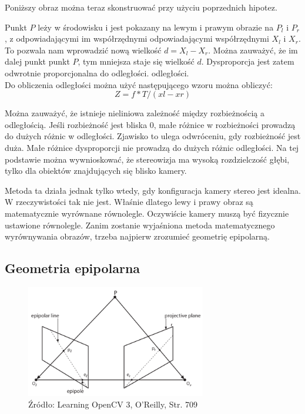 \documentclass[magisterska]{pracadypl}
\begin{document}
Poniższy obraz można teraz skonstruować przy użyciu poprzednich hipotez.

Punkt $P$ leży w środowisku i jest pokazany na
lewym i prawym obrazie na $P_l$ i $P_r$, z odpowiadającymi im współrzędnymi
odpowiadającymi współrzędnymi $X_l$ i $X_r$. To
pozwala nam wprowadzić nową wielkość
$d = X_l - X_r$. Można zauważyć, że im dalej punkt
punkt $P$, tym mniejsza staje się wielkość $d$. Dysproporcja
jest zatem odwrotnie proporcjonalna do odległości.
odległości.\\
Do obliczenia odległości można użyć następującego wzoru
można obliczyć: \[Z=f*T/(xl-xr)\]

Można zauważyć, że istnieje nieliniowa zależność między rozbieżnością a odległością.
Jeśli rozbieżność jest bliska 0, małe różnice w rozbieżności prowadzą do dużych różnic w odległości.
Zjawisko to ulega odwróceniu, gdy rozbieżność jest duża. Małe różnice dysproporcji nie prowadzą do dużych różnic odległości. Na tej podstawie można wywnioskować, że stereowizja ma wysoką rozdzielczość głębi, tylko dla obiektów znajdujących się blisko kamery.

Metoda ta działa jednak tylko wtedy, gdy konfiguracja kamery stereo jest idealna. W
rzeczywistości tak nie jest. Właśnie dlatego lewy i prawy obraz są
matematycznie wyrównane równolegle. Oczywiście kamery muszą być fizycznie ustawione równolegle.
Zanim zostanie wyjaśniona metoda matematycznego wyrównywania obrazów, trzeba najpierw zrozumieć geometrię epipolarną.

\subsection{Geometria epipolarna}

\begin{figure}[h]  %
    \centering  %
    \includegraphics[width=0.7\textwidth]{images/epipolar.png}  %
    \captionsetup{labelformat=empty, font=footnotesize}
    \caption{Źródło: Learning OpenCV 3, O'Reilly, Str. 709}
    \label{fig:rpi}  %
\end{figure}
\end{document}
